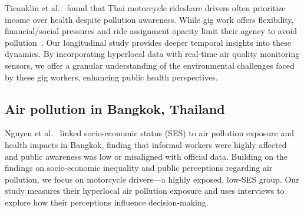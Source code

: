 Tieanklin et al.~\cite{tieanklin2024rideshare} found that Thai motorcycle rideshare drivers often prioritize income over health despite pollution awareness.
While gig work offers flexibility, financial/social pressures and ride assignment opacity limit their agency to avoid pollution~\cite{machado2021midlife,elfassy2019associations}.
Our longitudinal study provides deeper temporal insights into these dynamics.
By incorporating hyperlocal data with real-time air quality monitoring sensors, we offer a granular understanding of the environmental challenges faced by these gig workers, enhancing public health perspectives.





\subsection{Air pollution in Bangkok, Thailand}
Nguyen et al.~\cite{nguyen2023bangkokpollution} linked socio-economic status (SES) to air pollution exposure and health impacts in Bangkok, finding that informal workers were highly affected and public awareness was low or misaligned with official data.
Building on the findings on socio-economic inequality and public perceptions regarding air pollution, we focus on motorcycle drivers—a highly exposed, low-SES group.
Our study measures their hyperlocal air pollution exposure and uses interviews to explore how their perceptions influence decision-making.

